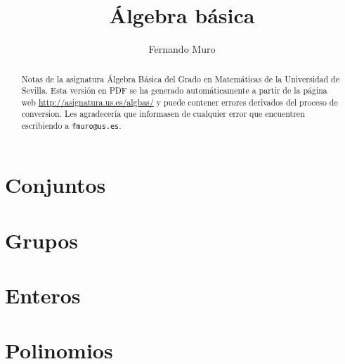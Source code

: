 \documentclass[]{amsart}
\title{Álgebra básica}
\author{Fernando Muro}
\theoremstyle{definition}
\theoremstyle{remark}
\numberwithin{equation}{subsection}
\begin{document}
\begin{abstract}
Notas de la asignatura Álgebra Básica del Grado en Matemáticas de la Universidad de Sevilla. Esta versión en PDF se ha generado automáticamente a partir de la página web \url{http://asignatura.us.es/algbas/} y puede contener errores derivados del proceso de conversion. Les agradecería que informasen de cualquier error que encuentren escribiendo a \texttt{fmuro@us.es}.
\end{abstract}

\maketitle

\tableofcontents

\section{Conjuntos}



\section{Grupos}



\section{Enteros}



\section{Polinomios}


\end{document}
